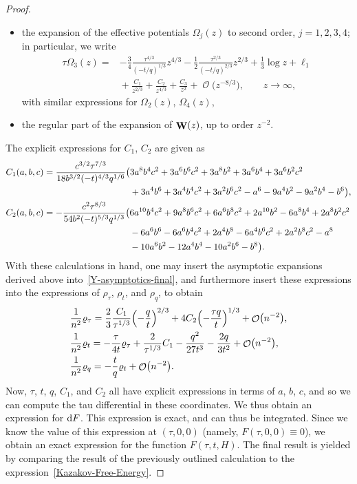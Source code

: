 \documentclass[pdftex]{sigma}
\DeclareMathOperator{\OO}{\mathcal{O}}
\DeclareMathOperator{\WW}{{\bf W}}
\numberwithin{equation}{section}
\begin{document}
\begin{proof}
\begin{itemize}
 \item the expansion of the effective potentials $\Omega_j(z)$ to second order, $j=1,2,3,4$; in particular, we write
 \begin{align*}
 \tau \Omega_3(z) ={}&{-}\frac{3}{4}\frac{\tau^{4/3}}{(-t/q)^{1/3}}z^{4/3} - \frac{1}{2}\frac{\tau^{2/3}}{(-t/q)^{2/3}}z^{2/3} + \frac{1}{3}\log z + \ell_1\\
 &{}+ \frac{C_1}{z^{2/3}} + \frac{C_2}{z^{4/3}} + \frac{C_3}{z^2} + \OO\bigl(z^{-8/3}\bigr), \qquad z\to \infty,
 \end{align*}
 with similar expressions for $\Omega_2(z)$, $\Omega_4(z)$,
 \item the regular part of the expansion of $\WW(z)$, up to order $z^{-2}$.
 \end{itemize}

 The explicit expressions for $C_1$, $C_2$ are given as
 \begin{align*}
 C_1(a,b,c)={}& \frac{c^{3/2}\tau^{7/3}}{18b^{3/2}(-t)^{4/3}q^{1/6}}\bigl(3a^8b^4c^2 + 3a^6b^6c^2 + 3a^8b^2 + 3a^6b^4 + 3a^6b^2c^2\nonumber\\
 &\hphantom{\frac{c^{3/2}\tau^{7/3}}{18b^{3/2}(-t)^{4/3}q^{1/6}}\bigl(}{}
 + 3a^4b^6 + 3a^4b^4c^2 + 3a^2b^6c^2 - a^6 - 9a^4b^2 - 9a^2b^4 - b^6\bigr),\\
 C_2(a,b,c)={}& {-}\frac{c^2 \tau^{8/3}}{54 b^2 (-t)^{5/3} q^{1/3}} \bigl( 6a^{10}b^4c^2 + 9a^8b^6c^2 + 6a^6b^8c^2 + 2a^{10}b^2 - 6a^8b^4 + 2a^8b^2c^2 \nonumber\\
 &\hphantom{{-}\frac{c^2 \tau^{8/3}}{54 b^2 (-t)^{5/3} q^{1/3}} \bigl(}{}
 -6a^6b^6 - 6a^6b^4c^2 + 2a^4b^8 - 6a^4b^6c^2 + 2a^2b^8c^2 - a^8\\
 &\hphantom{{-}\frac{c^2 \tau^{8/3}}{54 b^2 (-t)^{5/3} q^{1/3}} \bigl(}{}
 - 10a^6b^2 - 12a^4b^4 - 10a^2b^6 - b^8\bigr).
 \end{align*}
 With these calculations in hand, one may insert the asymptotic expansions derived above into~\eqref{Y-asymptotics-final}, and furthermore insert these expressions into the expressions of
 $\rho_{\tau}$, $\rho_t$, and $\rho_q$, to obtain
 \begin{align*}
 &\frac{1}{n^2}\varrho_{\tau}= \frac{2}{3}\frac{C_1}{\tau^{1/3}} \Bigl(-\frac{q}{t}\Bigr)^{2/3} + 4 C_2\Bigl(-\frac{\tau q}{t}\Bigr)^{1/3} + \OO\bigl(n^{-2}\bigr),\\
 &\frac{1}{n^2}\varrho_t= -\frac{\tau}{4t}\varrho_\tau +\frac{2}{\tau^{1/3}}C_1 -\frac{q^2}{27t^3} - \frac{2q}{3t^2} + \OO\bigl(n^{-2}\bigr),\\
 &\frac{1}{n^2}\varrho_q= -\frac{t}{q}\varrho_t + \OO\bigl(n^{-2}\bigr).
 \end{align*}
 Now, $\tau$, $t$, $q$, $C_1$, and $C_2$ all have explicit expressions in terms of $a$, $b$, $c$, and so we can compute the tau differential in these coordinates. We thus obtain an expression for ${\rm d}F$. This expression is exact,
 and can thus be integrated. Since we know the value of this expression at $(\tau,0,0)$ (namely, $F(\tau,0,0)\equiv 0$), we obtain an exact expression for the function $F(\tau,t,H)$. The final result is yielded by comparing the result of the previously outlined calculation to the expression~\eqref{Kazakov-Free-Energy}.
\end{proof}
\end{document}
